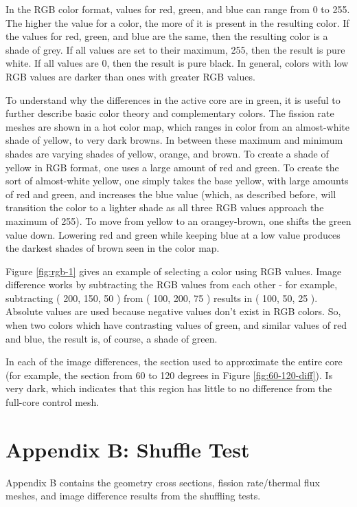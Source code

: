 In the RGB color format, values for red, green, and blue can range from 0 to 255.  The higher the value for a color, the more of it is present in the resulting color.  If the values for red, green, and blue are the same, then the resulting color is a shade of grey.  If all values are set to their maximum, 255, then the result is pure white.  If all values are 0, then the result is pure black.  In general, colors with low RGB values are darker than  ones with greater RGB values.

To understand why the differences in the active core are in green, it is useful to further describe basic color theory and complementary colors.  The fission rate meshes are shown in a hot color map, which ranges in color from an almost-white shade of yellow, to very dark browns.  In between these maximum and minimum shades are varying shades of yellow, orange, and brown.  To create a shade of yellow in RGB format, one uses a large amount of red and green.  To create the sort of almost-white yellow, one simply takes the base yellow, with large amounts of red and green, and increases the blue value (which, as described before, will transition the color to a lighter shade as all three RGB values approach the maximum of 255).  To move from yellow to an orangey-brown, one shifts the green value down.  Lowering red and green while keeping blue at a low value produces the darkest shades of brown seen in the color map.



Figure \ref{fig:rgb-1} gives an example of selecting a color using RGB values.  Image difference works by subtracting the RGB values from each other - for example, subtracting ( 200, 150, 50 ) from ( 100, 200, 75 ) results in ( 100, 50, 25 ).  Absolute values are used because negative values don't exist in RGB colors.  So, when  two colors which have contrasting values of green, and similar values of red and blue, the result is, of course, a shade of green.

In each of the image differences, the section used to approximate the entire core (for example, the section from 60 to 120 degrees in Figure \ref{fig:60-120-diff}).  Is very dark, which indicates that this region has little to no difference from the full-core control mesh.


\section{Appendix B: Shuffle Test}
Appendix B contains the geometry cross sections, fission rate/thermal flux meshes, and image difference results from the                                                                                                                                                                                                                                         shuffling tests.


